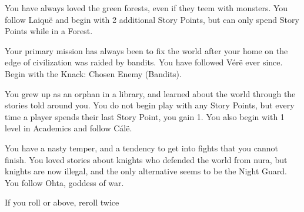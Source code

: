 \begin{multicols}{2}
\begin{list}{\addtocounter{list}{1}\textbf{:}}{\raggedleft}
\item
You have always loved the green forests, even if they teem with monsters.
You follow Laiqu\"e and begin with 2 additional Story Points, but can only spend Story Points while in a Forest.

\item
Your primary mission has always been to fix the world after your home on the edge of civilization was raided by bandits.
You have followed V\'er\"e ever since.
Begin with the Knack: Chosen Enemy (Bandits).

\item
You grew up as an orphan in a library, and learned about the world through the stories told around you.
You do not begin play with any Story Points, but every time a player spends their  last Story Point, you gain 1.
You also begin with 1 level in Academics and follow C\'al\"e.

\item
You have a nasty temper, and a tendency to get into fights that you cannot finish.
You loved stories about knights who defended the world from nura, but knights are now illegal, and the only alternative seems to be the Night Guard.
You follow Ohta, goddess of war.

\item{If you roll  or above, reroll twice}

\end{list}

\end{multicols}
